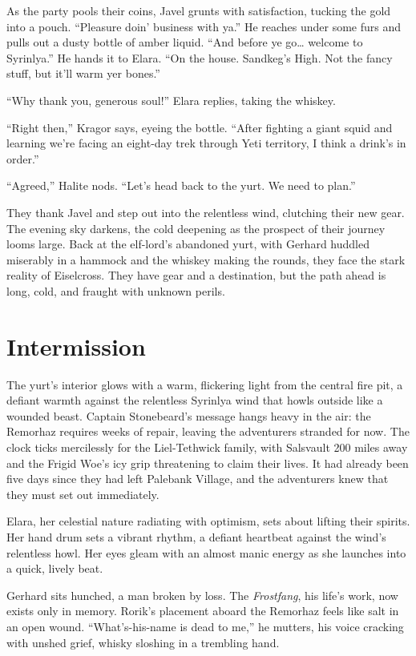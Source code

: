 \documentclass[
  letterpaper,12pt,twoside,twocolumn,openany,
  nodeprecatedcode,bg=full]{dndbook}
\begin{document}
As the party pools their coins, Javel grunts with satisfaction, tucking
the gold into a pouch. ``Pleasure doin' business with ya.'' He reaches
under some furs and pulls out a dusty bottle of amber liquid. ``And
before ye go\ldots{} welcome to Syrinlya.'' He hands it to Elara. ``On
the house. Sandkeg's High. Not the fancy stuff, but it'll warm yer
bones.''

``Why thank you, generous soul!'' Elara replies, taking the whiskey.

``Right then,'' Kragor says, eyeing the bottle. ``After fighting a giant
squid and learning we're facing an eight-day trek through Yeti
territory, I think a drink's in order.''

``Agreed,'' Halite nods. ``Let's head back to the yurt. We need to
plan.''

They thank Javel and step out into the relentless wind, clutching their
new gear. The evening sky darkens, the cold deepening as the prospect of
their journey looms large. Back at the elf-lord's abandoned yurt, with
Gerhard huddled miserably in a hammock and the whiskey making the
rounds, they face the stark reality of Eiselcross. They have gear and a
destination, but the path ahead is long, cold, and fraught with unknown
perils.

\chapter{Intermission}\label{intermission}

The yurt's interior glows with a warm, flickering light from the central
fire pit, a defiant warmth against the relentless Syrinlya wind that
howls outside like a wounded beast. Captain Stonebeard's message hangs
heavy in the air: the Remorhaz requires weeks of repair, leaving the
adventurers stranded for now. The clock ticks mercilessly for the
Liel-Tethwick family, with Salsvault 200 miles away and the Frigid Woe's
icy grip threatening to claim their lives. It had already been five days
since they had left Palebank Village, and the adventurers knew that they
must set out immediately.

Elara, her celestial nature radiating with optimism, sets about lifting
their spirits. Her hand drum sets a vibrant rhythm, a defiant heartbeat
against the wind's relentless howl. Her eyes gleam with an almost manic
energy as she launches into a quick, lively beat.

Gerhard sits hunched, a man broken by loss. The \emph{Frostfang}, his
life's work, now exists only in memory. Rorik's placement aboard the
Remorhaz feels like salt in an open wound. ``What's-his-name is dead to
me,'' he mutters, his voice cracking with unshed grief, whisky sloshing
in a trembling hand.
\end{document}
